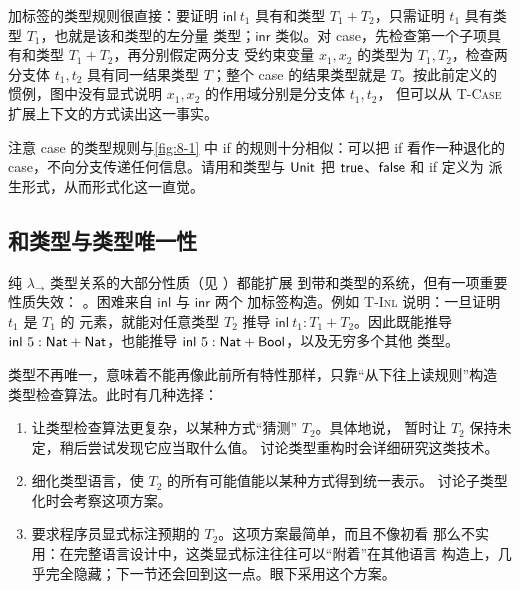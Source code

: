 加标签的类型规则很直接：要证明 \(\mathsf{inl}\ t_1\) 具有和类型
\(T_1+T_2\)，只需证明 \(t_1\) 具有类型 \(T_1\)，也就是该和类型的左分量
类型；\(\mathsf{inr}\) 类似。对 case，先检查第一个子项具有和类型
\(T_1+T_2\)，再分别假定两分支
受约束变量 \(x_1,x_2\) 的类型为 \(T_1,T_2\)，检查两分支体 \(t_1,t_2\)
具有同一结果类型 \(T\)；整个 case 的结果类型就是 \(T\)。按此前定义的
惯例，图中没有显式说明 \(x_1,x_2\) 的作用域分别是分支体 \(t_1,t_2\)，
但可以从 \textsc{T-Case} 扩展上下文的方式读出这一事实。

\begin{exercise}[\(\star\star\)]
\label{ex:11.9.1}
注意 case 的类型规则与\cref{fig:8-1} 中 if 的规则十分相似：可以把 if
看作一种退化的 case，不向分支传递任何信息。请用和类型与
\(\mathsf{Unit}\) 把 \(\mathsf{true}\)、\(\mathsf{false}\) 和 if 定义为
派生形式，从而形式化这一直觉。
\end{exercise}

\subsection*{和类型与类型唯一性}

纯 \(\lambda_{\to}\) 类型关系的大部分性质（见 ）都能扩展
到带和类型的系统，但有一项重要性质失效：
。困难来自
\(\mathsf{inl}\) 与 \(\mathsf{inr}\) 两个
加标签构造。例如 \textsc{T-Inl} 说明：一旦证明 \(t_1\) 是 \(T_1\) 的
元素，就能对任意类型 \(T_2\) 推导
\(\mathsf{inl}\ t_1:T_1+T_2\)。因此既能推导
\(\mathsf{inl}\ 5:\tapltype{Nat}+\tapltype{Nat}\)，也能推导
\(\mathsf{inl}\ 5:\tapltype{Nat}+\tapltype{Bool}\)，以及无穷多个其他
类型。

类型不再唯一，意味着不能再像此前所有特性那样，只靠“从下往上读规则”构造
类型检查算法。此时有几种选择：
\begin{enumerate}
  \item 让类型检查算法更复杂，以某种方式“猜测” \(T_2\)。具体地说，
    暂时让 \(T_2\) 保持未定，稍后尝试发现它应当取什么值。
    讨论类型重构时会详细研究这类技术。
  \item 细化类型语言，使 \(T_2\) 的所有可能值能以某种方式得到统一表示。
    讨论子类型化时会考察这项方案。
  \item 要求程序员显式标注预期的 \(T_2\)。这项方案最简单，而且不像初看
    那么不实用：在完整语言设计中，这类显式标注往往可以“附着”在其他语言
    构造上，几乎完全隐藏；下一节还会回到这一点。眼下采用这个方案。
\end{enumerate}


